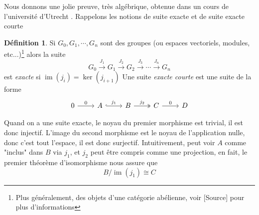 \documentclass[a4paper,12pt,oneside,titlepage]{article}
\newcommand{\im}[0]{\operatorname{im}}
\theoremstyle{definition}
\newtheorem{definition}{Définition}[section]
\theoremstyle{plain}
\begin{document}
Nous donnons une jolie preuve, très algébrique, obtenue dans un cours de l'université d'Utrecht \cite{Marcut2009FredholmNotes}. 
Rappelons les notions de suite exacte et de suite exacte courte
\begin{definition}
    Si $G_0,G_1,\cdots, G_n$ sont des groupes (ou espaces vectoriels, modules, etc...)\footnote{Plus généralement, des objets d'une catégorie abélienne, voir [Source] pour plus d'informations} alors la suite 
    \begin{equation*}
       G_0 \xrightarrow{J_1} G_1 \xrightarrow{J_2} G_2 \xrightarrow{J_3} \cdots \xrightarrow{J_n} G_n
    \end{equation*}
    est \textit{exacte} si $\im(j_i)=\ker(j_{i+1})$
    Une suite \textit{exacte courte} est une suite de la forme
    \[\begin{tikzcd}
	0 & A & B & C & D
	\arrow["0", from=1-1, to=1-2]
	\arrow["{j_1}", hook, from=1-2, to=1-3]
	\arrow["{j_2}", two heads, from=1-3, to=1-4]
	\arrow["0", from=1-4, to=1-5]
    \end{tikzcd}\]
\end{definition}
Quand on a une suite exacte, le noyau du premier morphisme est trivial, il est donc injectif. L'image du second morphisme est le noyau de l'application nulle, donc c'est tout l'espace, il est donc surjectif. Intuitivement, peut voir $A$ comme "inclus" dans $B$ via $j_1$, et $j_2$ peut être compris comme une projection, en fait, le premier théorème d'isomorphisme nous assure que 
\begin{equation*}
    B/\im(j_1)\cong C
\end{equation*}
\end{document}

